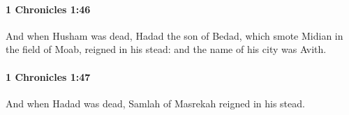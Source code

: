 		\paragraph{1 Chronicles 1:46} %
			\label{1CHRONICLES-1-46}

			And when Husham was dead, Hadad the son of Bedad, which smote Midian in the field of Moab, reigned in his stead: and the name of his city was Avith.


		\paragraph{1 Chronicles 1:47} %
			\label{1CHRONICLES-1-47}

			And when Hadad was dead, Samlah of Masrekah reigned in his stead.


